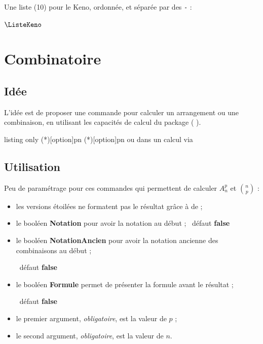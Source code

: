 \documentclass[a4paper,french,11pt]{article}
\newcommand\ctex[1]{\tcbox[vignettelatex]{#1}}
\newcommand\cmaj[1]{%
	{\tcbox[vignetteMaJ]{#1}\xspace}%
}
\newcommand\Cle[1]{{\bfseries\sffamily\textlangle #1\textrangle}}
\begin{document}
\begin{PresCodePL}{}
Une liste (10) pour le Keno\textcopyright, ordonnée, et séparée par des \texttt{-} :

\TirageAleatoireEntiers[ValMin=1,ValMax=70,NbVal=10,Tri=croissant,Sep={-}]{\ListeKeno}
$\ListeKeno$

\setsepchar{-}\readlist*\KENO{\ListeKeno}\showitems{\KENO}
\end{PresCodePL}

\newpage

\section{Combinatoire}\label{combinatoire}

\subsection{Idée}

\begin{tipblock}
L'idée est de proposer une commande pour calculer un arrangement ou une combinaison, en utilisant les capacités de calcul du package \ctex{xint} (\cmaj{2.5.4}).
\end{tipblock}

\begin{PresCodeTexPL}{listing only}
\Arrangement(*)[option]{p}{n}
\Combinaison(*)[option]{p}{n}
 ou  dans un calcul via 
\end{PresCodeTexPL}

\subsection{Utilisation}

\begin{cautionblock}
Peu de paramétrage pour ces commandes qui permettent de calculer $A_n^p$ et $\binom{n}{p}$ :

\begin{itemize}
	\item les versions étoilées ne formatent pas le résultat grâce à \ctex{\textbackslash num} de \ctex{sinuitx} ;
	\item le booléen \Cle{Notation} pour avoir la notation au début ; \hfill~défaut \Cle{false}
	\item le booléen \Cle{NotationAncien} pour avoir la notation \og ancienne \fg{} des combinaisons au début ;
	
	\hfill~défaut \Cle{false}
	\item le booléen \Cle{Formule} permet de présenter la formule avant le résultat ;
	
	\hfill~défaut \Cle{false}
	\item le premier argument, \textit{obligatoire}, est la valeur de $p$ ;
	\item le second argument, \textit{obligatoire}, est la valeur de $n$.
\end{itemize}
\vspace*{-\baselineskip}\leavevmode
\end{cautionblock}
\end{document}
